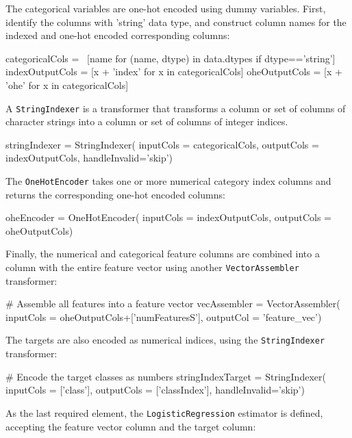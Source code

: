 The categorical variables are one-hot encoded using dummy variables. First, identify the columns with 'string' data type, and construct column names for the indexed and one-hot encoded corresponding columns:

\begin{pythoncode}
categoricalCols = \
    [name for (name, dtype) in data.dtypes if dtype=='string']
indexOutputCols = [x + 'index' for x in categoricalCols]
oheOutputCols = [x + 'ohe' for x in categoricalCols]
\end{pythoncode}

A \texttt{StringIndexer} is a transformer that transforms a column or set of columns of character strings into a column or set of columns of integer indices.

\begin{pythoncode}
stringIndexer = StringIndexer(
    inputCols = categoricalCols,
    outputCols = indexOutputCols,
    handleInvalid='skip')
\end{pythoncode}

The \texttt{OneHotEncoder} takes one or more numerical category index columns and returns the corresponding one-hot encoded columns:

\begin{pythoncode}
oheEncoder = OneHotEncoder(
    inputCols = indexOutputCols,
    outputCols = oheOutputCols)
\end{pythoncode}

Finally, the numerical and categorical feature columns are combined into a column with the entire feature vector using another \texttt{VectorAssembler} transformer:

\begin{pythoncode}
# Assemble all features into a feature vector
vecAssembler = VectorAssembler(
    inputCols = oheOutputCols+['numFeaturesS'],
    outputCol = 'feature_vec')
\end{pythoncode}

The targets are also encoded as numerical indices, using the \texttt{StringIndexer} transformer:

\begin{pythoncode}
# Encode the target classes as numbers
stringIndexTarget = StringIndexer(
    inputCols = ['class'],
    outputCols = ['classIndex'],
    handleInvalid='skip')
\end{pythoncode}    

As the last required element, the \texttt{LogisticRegression} estimator is defined, accepting the feature vector column and the target column:

